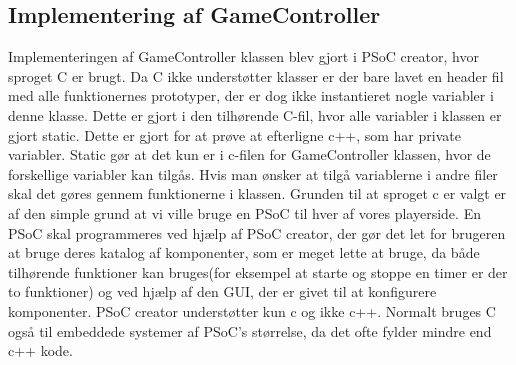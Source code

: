 \documentclass[Softwaredesign/Softwaredesign_main.tex]{subfiles}
\begin{document}
\subsection{Implementering af GameController}\label{sec:GameController_implementering_bilag}
Implementeringen af GameController klassen blev gjort i PSoC creator, hvor sproget C er brugt. Da C ikke understøtter klasser er der bare lavet en header fil med alle funktionernes prototyper, der er dog ikke instantieret nogle variabler i denne klasse. Dette er gjort i den tilhørende C-fil, hvor alle variabler i klassen er gjort static. Dette er gjort for at prøve at efterligne c++, som har private variabler. Static gør at det kun er i c-filen for GameController klassen, hvor de forskellige variabler kan tilgås. Hvis man ønsker at tilgå variablerne i andre filer skal det gøres gennem funktionerne i klassen. Grunden til at sproget c er valgt er af den simple grund at vi ville bruge en PSoC til hver af vores playerside. En PSoC skal programmeres ved hjælp af PSoC creator, der gør det let for brugeren at bruge deres katalog af komponenter, som er meget lette at bruge, da både tilhørende funktioner kan bruges(for eksempel at starte og stoppe en timer er der to funktioner) og ved hjælp af den GUI, der er givet til at konfigurere komponenter. PSoC creator understøtter kun c og ikke c++. Normalt bruges C også til embeddede systemer af PSoC's størrelse, da det ofte fylder mindre end c++ kode.
\end{document}
